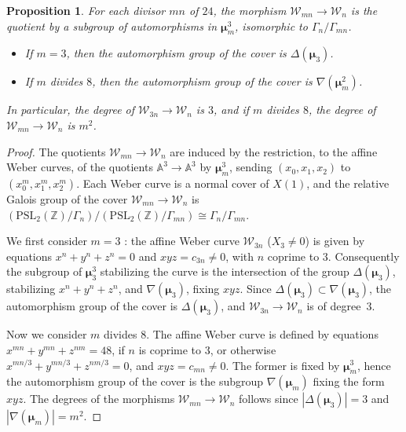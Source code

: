 \documentclass{amsart}
\newcommand{\cW}{\mathcal{W}}
\renewcommand{\AA}{\mathbb{A}}
\newcommand{\ZZ}{\mathbb{Z}}
\newcommand{\PSL}{\mathrm{PSL}}
\newcommand{\isom}{\cong}
\newcommand{\mmu}{\boldsymbol{\mu}}
\newtheorem{proposition}[theorem]{Proposition}
\begin{document}
\begin{proposition}
  \label{prop:Weber_groups}
  For each divisor $mn$ of $24$, the morphism $\cW_{mn} \to \cW_n$ is the quotient by
  a subgroup of automorphisms in $\mmu_m^3$, isomorphic to $\Gamma_{n}/\Gamma_{mn}$.
  \begin{itemize}
  \item
    If $m = 3$, then the automorphism group of the cover is $\Delta(\mmu_3)$. %
  \item
    If $m$ divides $8$, then the automorphism group of the
    cover is $\nabla(\mmu_m^2)$. %
  \end{itemize}
  In particular, the degree of $\cW_{3n} \rightarrow \cW_n$ is $3$, and if $m$ divides $8$,
  the degree of $\cW_{mn} \rightarrow \cW_n$ is $m^2$.
\end{proposition}

\begin{proof}
  The quotients $\cW_{mn} \to \cW_n$ are induced by the restriction, to the
  affine Weber curves, of the quotients $\AA^3 \to \AA^3$ by $\mmu_m^3$,
  sending $(x_0,x_1,x_2)$ to $(x_0^m,x_1^m,x_2^m)$.  Each Weber curve is a
  normal cover of $X(1)$, and the relative Galois group of the cover
  $\cW_{mn} \to \cW_n$ is
  $
  \left(\PSL_2(\ZZ)/\Gamma_{n}\right)/\left(\PSL_2(\ZZ)/\Gamma_{mn}\right) \isom \Gamma_{n}/\Gamma_{mn}.
  $

  We first consider $m = 3$ : the affine Weber curve $\cW_{3n}$ ($X_3 \ne 0$)
  is given by equations $x^{n}+y^{n}+z^{n} = 0$ and $x y z = c_{3n} \ne 0$,
  with $n$ coprime to $3$.
  Consequently the subgroup of $\mmu_3^3$ stabilizing the curve is the
  intersection of the group $\Delta(\mmu_3)$, stabilizing $x^n + y^n + z^n$,
  and $\nabla(\mmu_3)$, fixing $xyz$.
  Since $\Delta(\mmu_3) \subset \nabla(\mmu_3)$, the automorphism group of
  the cover is $\Delta(\mmu_3)$, and $\cW_{3n} \to \cW_n$ is of degree~$3$.

  Now we consider $m$ divides $8$. The affine Weber curve is defined by 
  equations $x^{mn} + y^{mn} + z^{nm} = 48$, if $n$ is coprime to $3$,
  or otherwise $x^{mn/3} + y^{mn/3} + z^{nm/3} = 0$, and $xyz = c_{mn} \ne 0$.
  The former is fixed by $\mmu_m^3$, hence the automorphism group of the
  cover is the subgroup $\nabla(\mmu_m)$ fixing the form $xyz$.
  The degrees of the morphisms $\cW_{mn} \to \cW_n$ follows since
  $|\Delta(\mmu_3)| = 3$ and $|\nabla(\mmu_m)| = m^2$.
\end{proof}
\end{document}
